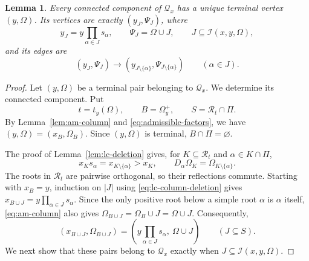 \documentclass[12pt]{amsart}
\newtheorem{lemma}[theorem]{Lemma}
\theoremstyle{definition}
\numberwithin{equation}{section}
\begin{document}
\begin{lemma}\label{lem:lc-boolean}
Every connected component of $\mathscr Q_x$ has a unique terminal
vertex $(y,\Omega)$. Its vertices are exactly $(y_J,\Psi_J)$, where
\begin{equation}\label{eq:lc-cube-vertices}
y_J=y\prod_{\alpha\in J}s_\alpha,\qquad
\Psi_J=\Omega\cup J,\qquad
J\subseteq\mathscr I(x,y,\Omega),
\end{equation}
and its edges are
\begin{equation}\label{eq:lc-cube-edges}
(y_J,\Psi_J)\longrightarrow
(y_{J\setminus\{\alpha\}},\Psi_{J\setminus\{\alpha\}})
\qquad(\alpha\in J).
\end{equation}
\end{lemma}

\begin{proof}
Let $(y,\Omega)$ be a terminal pair belonging to $\mathscr Q_x$.
We determine its connected component. Put
\[
t=t_y(\Omega),\qquad B=\Omega_y^+,\qquad
S=\mathscr R_t\cap\Pi.
\]
By Lemma~\ref{lem:am-column} and \eqref{eq:admissible-factors},
we have $(y,\Omega)=(x_B,\Omega_B)$.
Since $(y,\Omega)$ is terminal, $B\cap\Pi=\varnothing$.

The proof of Lemma~\ref{lem:lc-deletion} gives, for
$K\subseteq\mathscr R_t$ and $\alpha\in K\cap\Pi$,
\begin{equation}\label{eq:lc-column-deletion}
x_Ks_\alpha=x_{K\setminus\{\alpha\}}>x_K,
\qquad
D_\alpha\Omega_K=\Omega_{K\setminus\{\alpha\}}.
\end{equation}
The roots in $\mathscr R_t$ are pairwise orthogonal, so their
reflections commute. Starting with $x_B=y$, induction on $|J|$
using \eqref{eq:lc-column-deletion} gives
$x_{B\cup J}=y\prod_{\alpha\in J}s_\alpha$.
Since the only positive root below a simple root $\alpha$
is $\alpha$ itself, \eqref{eq:am-column} also gives
$\Omega_{B\cup J}=\Omega_B\cup J=\Omega\cup J$.
Consequently,
\[
(x_{B\cup J},\Omega_{B\cup J})
=
\left(y\prod_{\alpha\in J}s_\alpha,\ \Omega\cup J\right)
\qquad(J\subseteq S).
\]
We next show that these pairs belong to $\mathscr Q_x$
exactly when $J\subseteq\mathscr I(x,y,\Omega)$.


\end{proof}
\end{document}

